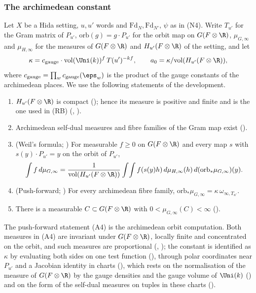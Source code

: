 \subsubsection*{The archimedean constant}

Let $X$ be a Hida setting, $u,u'$ words and $\mathrm{Fd}_N,\mathrm{Fd}_{N'}$, $\psi$ as in (N4). Write $T_{u'}$ for the Gram
matrix of $P_{u'}$, $\mathrm{orb}(g)=g\cdot P_{u'}$ for the orbit map on $G(F\otimes\R)$, $\mu_{G,\infty}$ and $\mu_{H,\infty}$
for the measures of $G(F\otimes\R)$ and $H_{u'}(F\otimes\R)$ of the setting, and let
\[
\kappa=c_{\mathrm{gauge}}\cdot\mathrm{vol}(\Uni(k))^f\,T(u')^{-kf},\qquad a_0=\kappa/\mathrm{vol}(H_{u'}(F\otimes\R)),
\]
where $c_{\mathrm{gauge}}=\prod_wc_{\mathrm{gauge}}(\eps_w)$ is the product of the gauge constants of the archimedean
places. We use the following statements of the development.
\begin{enumerate}[label=(A\arabic*)]
\item $H_{u'}(F\otimes\R)$ is compact (); hence its measure is
positive and finite and is the one used in (RB) (, ).
\item Archimedean self-dual measures and fibre families of the Gram map exist ().
\item (Weil's formula; ) For measurable $f\ge0$ on $G(F\otimes\R)$ and every map $s$
with $s(y)\cdot P_{u'}=y$ on the orbit of $P_{u'}$,
\[
\int f\,d\mu_{G,\infty}=\frac1{\mathrm{vol}(H_{u'}(F\otimes\R))}\int\!\int f(s(y)h)\,d\mu_{H,\infty}(h)\,
d(\mathrm{orb}_*\mu_{G,\infty})(y).
\]
\item (Push-forward; ) For every archimedean fibre
family, $\mathrm{orb}_*\mu_{G,\infty}=\kappa\,\omega_{\infty,T_{u'}}$.
\item There is a measurable $C\subset G(F\otimes\R)$ with $0<\mu_{G,\infty}(C)<\infty$ ().
\end{enumerate}
The push-forward statement (A4) is the archimedean orbit computation. Both measures in (A4) are invariant under
$G(F\otimes\R)$, locally finite and concentrated on the orbit, and such measures are proportional
(, ); the constant is identified as
$\kappa$ by evaluating both sides on one test function (), through
polar coordinates near $P_{u'}$ and a Jacobian identity in charts (), which rests
on the normalisation of the measure of $G(F\otimes\R)$ by the gauge densities and the gauge volume of $\Uni(k)$
() and on the form of the self-dual measures on tuples in these charts
().

